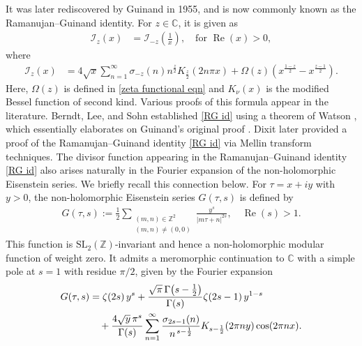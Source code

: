 \documentclass[12pt,reqno]{amsart}
\renewcommand{\Re}{\operatorname{Re}}
\renewcommand{\(}{\left\(}
\renewcommand{\)}{\right\)}
\renewcommand{\[}{\left\[}
\renewcommand{\]}{\right\]}
\numberwithin{equation}{section}
\theoremstyle{plain}
\begin{document}
It was later rediscovered by Guinand \cite{Guinand} in 1955, and is now commonly known as the Ramanujan–Guinand identity. For $z \in \mathbb{C}$, it is given as
\begin{align}\label{RG id}
\mathcal{I}_{z}(x) &= \mathcal{I}_{-z}\left(\frac{1}{x}\right), \quad \text{for} \,\, \Re(x) > 0,
\end{align}
where
\begin{align*}
\mathcal{I}_{z}(x) &= 4\sqrt{x}\sum_{n=1}^{\infty}\sigma_{-z}(n)n^{\frac{z}{2}}K_{\frac{z}{2}}(2n\pi x) + \Omega(z)\left(x^{\frac{1-z}{2}} - x^{\frac{z-1}{2}}\right).
\end{align*}
Here, $\Omega(z)$ is defined in \eqref{zeta functional eqn} and $K_{\nu}(x)$ is the modified Bessel function of second kind. Various proofs of this formula appear in the literature. Berndt, Lee, and Sohn \cite{BLS} established \eqref{RG id} using a theorem of Watson \cite{Watson}, which essentially elaborates on Guinand’s original proof \cite{Guinand}. Dixit \cite{Dixit} later provided a proof of the Ramanujan–Guinand identity \eqref{RG id} via Mellin transform techniques.
The divisor function appearing in the Ramanujan–Guinand identity \eqref{RG id} also arises naturally in the Fourier expansion of the non-holomorphic Eisenstein series. 
We briefly recall this connection below.
For $\tau=x+iy$ with $y>0$, the non-holomorphic Eisenstein series $G(\tau,s)$ is defined by
\begin{align*}
G(\tau,s):= \frac{1}{2}\sum_{\substack{(m,n)\in\mathbb{Z}^2\\(m,n)\neq(0,0)}} \frac{y^{s}}{|m\tau+n|^{2s}}, \quad \Re(s)>1.
\end{align*}
This function is $\mathrm{SL}_2(\mathbb{Z})$-invariant and hence a non-holomorphic modular function of weight zero. It admits a meromorphic continuation to $\mathbb{C}$ with a simple pole at $s=1$ with residue $\pi/2$, given by the Fourier expansion
\begin{align}
G(\tau,s)
&= \zeta(2s)\,y^{s}
+ \frac{\sqrt{\pi}\,\Gamma\!\left(s-\tfrac12\right)}{\Gamma(s)}\zeta(2s-1)\,y^{1-s} \notag \\
&\quad + \frac{4\sqrt{y}\,\pi^{s}}{\Gamma(s)}
\sum_{n=1}^{\infty}\frac{\sigma_{2s-1}(n)}{n^{\,s-\frac12}}
K_{s-\frac12}(2\pi n y)\cos(2\pi n x). \label{Fourier series}
\end{align}
\end{document}

